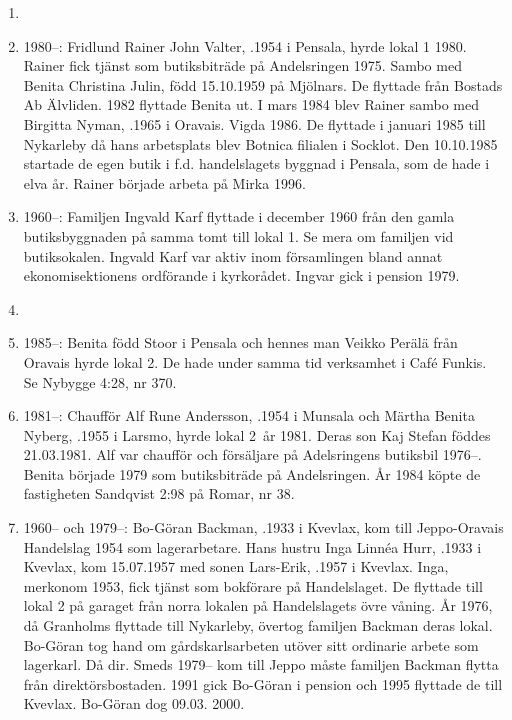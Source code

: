 \begin{enumerate}
  \item {}
  \item 1980--: Fridlund Rainer John Valter, .1954 i Pensala, hyrde lokal 1 1980. Rainer fick tjänst som butiksbiträde på Andelsringen 1975. Sambo med Benita Christina Julin, född 15.10.1959 på Mjölnars. De flyttade från Bostads Ab Älvliden. 1982 flyttade Benita ut. I mars 1984 blev Rainer sambo med Birgitta Nyman, .1965 i Oravais. Vigda 1986. De flyttade i januari 1985 till Nykarleby då hans arbetsplats blev Botnica filialen i Socklot. Den 10.10.1985 startade de egen butik i f.d. handelslagets byggnad i Pensala, som de hade i elva år. Rainer började arbeta på Mirka 1996.
  \item 1960--: Familjen Ingvald Karf flyttade i december 1960 från den gamla butiksbyggnaden på samma tomt till lokal 1. Se mera om familjen vid butiksokalen. Ingvald Karf var aktiv inom församlingen bland annat ekonomisektionens ordförande i kyrkorådet. Ingvar gick i pension 1979.
  \item {}
  \item 1985--: Benita född Stoor i Pensala och hennes man Veikko Perälä från Oravais hyrde lokal 2. De hade under samma tid verksamhet i Café Funkis. Se Nybygge 4:28, nr 370.
  \item 1981--: Chaufför Alf Rune Andersson, .1954 i Munsala och Märtha Benita Nyberg, .1955 i Larsmo, hyrde lokal 2 år 1981. Deras son Kaj Stefan föddes 21.03.1981. Alf var chaufför och försäljare på Adelsringens butiksbil 1976--. Benita började 1979 som butiksbiträde på Andelsringen. År 1984 köpte de fastigheten Sandqvist 2:98 på Romar, nr 38.
  \item 1960-- och 1979--: Bo-Göran Backman, .1933 i Kvevlax, kom till Jeppo-Oravais Handelslag 1954 som lagerarbetare. Hans hustru Inga Linnéa Hurr, .1933 i Kvevlax, kom 15.07.1957 med sonen Lars-Erik, .1957 i Kvevlax. Inga, merkonom 1953, fick tjänst som bokförare på Handelslaget. De flyttade till lokal 2 på garaget från norra lokalen på Handelslagets övre våning. År 1976, då Granholms flyttade till Nykarleby, övertog familjen Backman deras lokal. Bo-Göran tog hand om gårdskarlsarbeten utöver sitt ordinarie arbete som lagerkarl. Då dir. Smeds 1979-- kom till Jeppo måste familjen Backman flytta från direktörsbostaden. 1991 gick Bo-Göran i pension och 1995 flyttade de till Kvevlax. Bo-Göran dog 09.03. 2000.

\end{enumerate}
